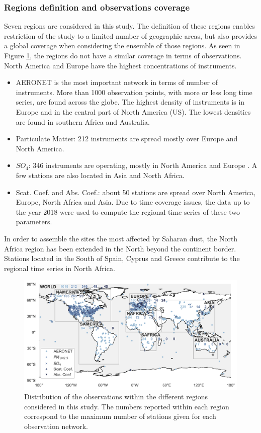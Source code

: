 \documentclass[journal abbreviation, manuscript]{copernicus}
\begin{document}
\subsubsection{Regions definition and observations coverage}
Seven regions are considered in this study. The definition of these regions enables restriction of the study to a limited number of geographic areas, but also provides a global coverage when considering the ensemble of those regions. As seen in Figure \ref{fig:map_obs}, the regions do not have a similar coverage in terms of observations. North America and Europe have the highest concentrations of instruments.
\begin{itemize}
 \item AERONET is the most important network in terms of number of instruments. More than 1000 observation points, with more or less long time series, are found across the globe. The highest density of instruments is in Europe and in the central part of North America (US). The lowest densities are found in southern Africa and Australia.
 \item Particulate Matter: 212 instruments are spread mostly over Europe and North America. 
 \item $SO_{4}$: 346 instruments are operating, mostly in North America and Europe . A few stations are also located in Asia and North Africa.
 \item Scat. Coef. and Abs. Coef.: about 50 stations are spread over North America, Europe, North Africa and Asia. Due to time coverage issues, the data up to the year 2018 were used to compute the regional time series of these two parameters.
\end{itemize}

In order to assemble the sites the most affected by Saharan dust, the North Africa region has been extended in the North beyond the continent border. Stations located in the South of Spain, Cyprus and Greece contribute to the regional time series in North Africa.

\begin{figure}
 \includegraphics[width=12cm]{../scripts/figs/maps/av_obs.png}
 \caption{Distribution of the observations within the different regions considered in this study. The numbers reported within each region correspond to the maximum number of stations given for each observation network.}
 \label{fig:map_obs}
\end{figure}
\end{document}
